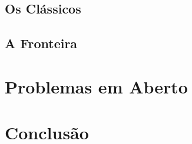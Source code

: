 \documentclass[sigconf]{acmart}
\begin{document}
 
  \subsection{Os Clássicos}
  \begin{figure}[b]
    \centering
    \caption{} \label{fig:studysite}
  \end{figure}

  \lipsum[3]
  \begin{figure}[t]
    \caption{} \label{fig:studysite}
  \end{figure}
  
  \subsection{A Fronteira}
  \lipsum[2]
  

\section{Problemas em Aberto}
\lipsum[3]
\section{Conclusão}
\lipsum[3]


\end{document}
